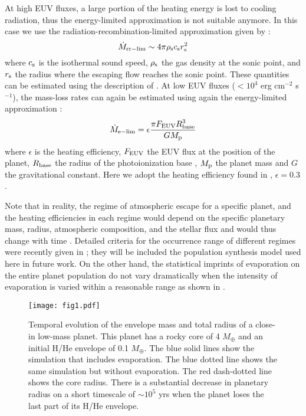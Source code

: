 \documentclass[]{emulateapj}
\begin{document}
At high EUV fluxes, a large portion of the heating energy is lost to cooling radiation, thus the energy-limited approximation is not suitable anymore. In this case we use the radiation-recombination-limited approximation given by \citet{Murray-Clay2009}:
\begin{equation}
  \dot{M}_{\rm rr-lim} \sim 4 \pi \rho_{\rm s} c_{\rm s} r_{\rm s}^2
\end{equation}
where $c_{\rm s}$ is the isothermal sound speed, $\rho_{\rm s}$ the gas density at the sonic point, and $r_{\rm s}$ the radius where the escaping flow reaches the sonic point. These quantities can be estimated using the description of \citet{Murray-Clay2009}. At low EUV fluxes ($<10^{4}$ erg cm$^{-2}$ s$^{-1}$), the mass-loss rates can again be estimated using again the energy-limited approximation \citep[e.g.,][]{Watson1981,Murray-Clay2009}:
\begin{equation}
  \dot{M}_{\rm e-lim}=\epsilon\frac{\displaystyle{\pi F_{\rm EUV} R^3_{\rm base}}}{\displaystyle{G M_{\rm p} }}
  \label{Mdotxray}
\end{equation}
where $\epsilon$ is the heating efficiency, $F_{\rm EUV}$ the EUV flux at the position of the planet, $R_{\rm base}$ the radius of the photoionization base \citep[estimated as in][]{Murray-Clay2009}, $M_{\rm p}$ the planet mass and $G$ the gravitational constant.
 Here we adopt the heating efficiency found in \citet{Murray-Clay2009}, $\epsilon=0.3$. 
 
Note that in reality, the regime of atmospheric escape for a specific planet, and the heating efficiencies in each regime  would depend on the specific planetary mass, radius, atmospheric composition, and the stellar flux and would thus change with time \citep{Yelle2004,Tian2005,Owen2012}. Detailed criteria for the occurrence range of different regimes were recently given in \citet{Owen2016}; they will be included the population synthesis model used here in future work. On the other hand, the statistical imprints of evaporation on the entire planet population do not vary dramatically when the intensity of evaporation is varied within a reasonable range as shown in \citet{Jin2014}. 

\begin{figure}
 \texttt{[image: fig1.pdf]}
 \caption{Temporal evolution of the envelope mass and total radius of a close-in low-mass planet. This planet has a rocky core of 4 $M_{\oplus}$  and an initial  H/He envelope of 0.1 $M_{\oplus}$. The blue solid lines show the simulation that includes evaporation. The blue dotted line shows the same simulation but  without evaporation. The red dash-dotted line shows the core radius. There is a substantial decrease in planetary radius on a short timescale of $\sim10^{5}$ yrs when the planet loses the last part of its H/He envelope.} \label{single}
\end{figure} 
\end{document}
